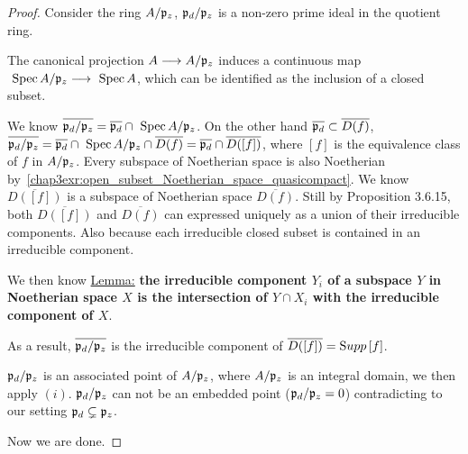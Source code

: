 \documentclass[11pt]{book} %
\begin{document}
\begin{proof}
 Consider the ring $A/{\mathfrak p}_z$, ${\mathfrak p}_d/{\mathfrak p}_z$ is a non-zero prime ideal in the quotient ring. 

The canonical projection $A\longrightarrow A/{\mathfrak p}_z$ induces a continuous map $\text{ Spec\,} A/{\mathfrak p}_z\longrightarrow \text{ Spec\,} A$, which can be identified as the inclusion of a closed subset.

We know $\overline{{\mathfrak p}_d/{\mathfrak p}_z}=\overline{{\mathfrak p}_d}\cap \text{ Spec\,} A/{\mathfrak p}_z$. On the other hand
$\overline{{\mathfrak p}_d}\subset \overline{D(f)}$, $\overline{{\mathfrak p}_d/{\mathfrak p}_z}=\overline{{\mathfrak p}_d}\cap \text{ Spec\,} A/{\mathfrak p}_z\cap \overline{D(f)}=\overline{{\mathfrak p}_d}\cap \overline{D([f])}$, where $[f]$ is the equivalence class of $f$ in $A/{\mathfrak p}_z$. Every subspace of Noetherian space is also Noetherian by~\ref{chap3exr:open_subset_Noetherian_space_quasicompact}. We know $\overline{D([f])}$ is a subspace of Noetherian space $\overline{D(f)}$. Still by Proposition 3.6.15, both $\overline{D([f])}$ and $\overline{D(f)}$
can expressed uniquely as a union of their irreducible components. Also because each irreducible closed subset is contained in an irreducible component. 

We then know
\underline{Lemma:}
\textbf{ the irreducible component $Y_i$ of a subspace $Y$ in Noetherian space $X$ is the intersection of $Y\cap X_i$ with the irreducible component of $X$}.

As a result, $\overline{{\mathfrak p}_d/{\mathfrak p}_z}$ is the irreducible component of $\overline{D([f])}={\text Supp\thinspace} [f]$.

${\mathfrak p}_d/{\mathfrak p}_z$ is an associated point of $A/{\mathfrak p}_z$, where $A/{\mathfrak p}_z$ is an integral domain, we then apply $(i)$. ${\mathfrak p}_d/{\mathfrak p}_z$ can not be an embedded point (${\mathfrak p}_d/{\mathfrak p}_z=0$) contradicting to our setting ${\mathfrak p}_d\subsetneq {\mathfrak p}_z$.

Now we are done.

 

\end{proof}
\end{document}
